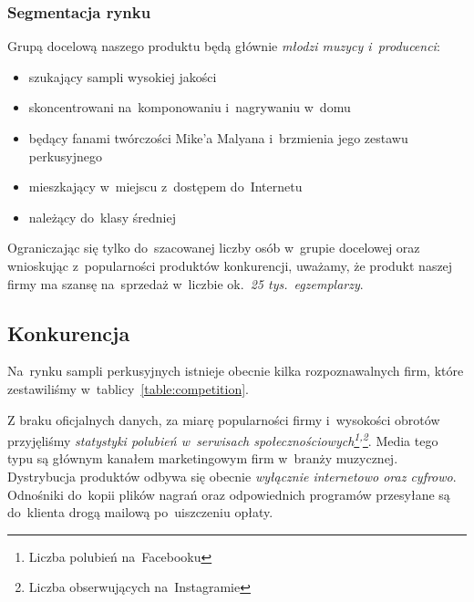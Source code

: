 \documentclass[12pt]{article}
\begin{document}

\subsubsection{Segmentacja rynku}


Grupą docelową naszego produktu będą głównie \emph{młodzi muzycy i~producenci}:
\begin{itemize}
    \item szukający sampli wysokiej jakości
    \item skoncentrowani na~komponowaniu i~nagrywaniu w~domu
    \item będący fanami twórczości Mike'a Malyana i~brzmienia jego zestawu perkusyjnego
    \item mieszkający w~miejscu z~dostępem do~Internetu
    \item należący do~klasy średniej
\end{itemize}

Ograniczając się tylko do~szacowanej liczby osób w~grupie docelowej oraz wnioskując z~popularności produktów konkurencji, uważamy, że produkt naszej firmy ma szansę na~sprzedaż w~liczbie ok.~\emph{25 tys.~egzemplarzy}.

\subsection{Konkurencja}


Na~rynku sampli perkusyjnych istnieje obecnie kilka rozpoznawalnych firm, które zestawiliśmy w~tablicy~\ref{table:competition}.

Z braku oficjalnych danych, za miarę popularności firmy i~wysokości obrotów przyjęliśmy \emph{statystyki polubień w~serwisach społecznościowych\footnote{Liczba polubień na~Facebooku\label{footnote:facebook}}\textsuperscript{,}\footnote{Liczba obserwujących na~Instagramie\label{footnote:instagram}}}.
Media tego typu są głównym kanałem marketingowym firm w~branży muzycznej.
Dystrybucja produktów odbywa się obecnie \emph{wyłącznie internetowo oraz cyfrowo}.
Odnośniki do~kopii plików nagrań oraz odpowiednich programów przesyłane są do~klienta drogą mailową po~uiszczeniu opłaty.
\end{document}

